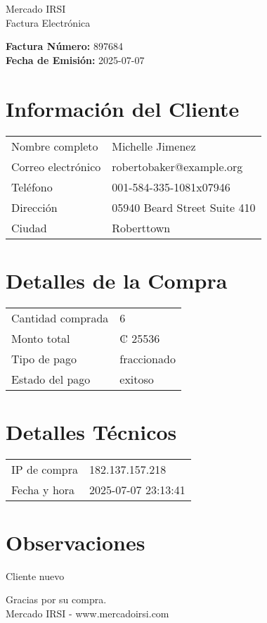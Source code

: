 \documentclass[12pt]{article}
\begin{document}
\begin{center}
    \Huge Mercado IRSI \\
    \Large Factura Electrónica
\end{center}

\vspace{0.5cm}

\noindent \textbf{Factura Número:} 897684 \\
\textbf{Fecha de Emisión:} 2025-07-07

\vspace{0.5cm}

\section*{Información del Cliente}
\begin{longtable}{ll}
Nombre completo & Michelle Jimenez \\
Correo electrónico & robertobaker@example.org \\
Teléfono & 001-584-335-1081x07946 \\
Dirección & 05940 Beard Street Suite 410 \\
Ciudad & Roberttown \\
\end{longtable}

\vspace{0.5cm}

\section*{Detalles de la Compra}
\begin{longtable}{ll}
Cantidad comprada & 6 \\
Monto total & ₡ 25536 \\
Tipo de pago & fraccionado \\
Estado del pago & exitoso \\
\end{longtable}

\vspace{0.5cm}

\section*{Detalles Técnicos}
\begin{longtable}{ll}
IP de compra & 182.137.157.218 \\
Fecha y hora & 2025-07-07 23:13:41 \\
\end{longtable}

\vspace{0.5cm}

\section*{Observaciones}
Cliente nuevo

\vspace{0.5cm}

\begin{center}
    Gracias por su compra. \\
    Mercado IRSI - www.mercadoirsi.com
\end{center}
\end{document}
